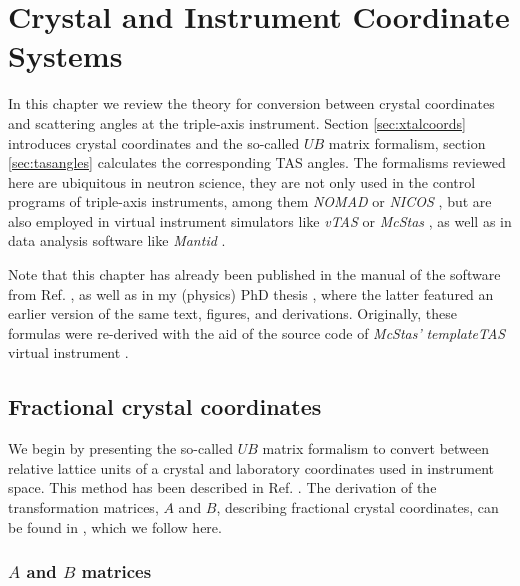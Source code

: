 %
%

\chapter{Crystal and Instrument Coordinate Systems}
\label{ch:xtal}

In this chapter we review the theory for conversion between crystal coordinates and scattering angles 
at the triple-axis instrument. Section \ref{sec:xtalcoords} introduces crystal coordinates and the so-called 
$UB$ matrix formalism, section \ref{sec:tasangles} calculates the corresponding TAS angles. 
The formalisms \cite{Lumsden2005} reviewed here are ubiquitous in neutron science, they are not only used 
in the control programs of triple-axis instruments, among them \textit{NOMAD} \cite{web_NOMAD} 
or \textit{NICOS} \cite{web_NICOS}, but are also employed in virtual instrument simulators like \textit{vTAS} \cite{vTAS2013} or 
\textit{McStas} \cite{McStas2020}, as well as in data analysis software like \textit{Mantid} \cite{Arnold2014}.

Note that this chapter has already been published in the manual of the software from Ref. \cite{Takin2021},
as well as in my (physics) PhD thesis \cite[pp. 139-143]{PhDWeber},
where the latter featured an earlier version of the same text, figures, and derivations.
Originally, these formulas were re-derived with the aid of the source
code of \textit{McStas'} \textit{templateTAS} virtual instrument \cite{web_mcstas_templateTAS, McStas2020}.


\section{Fractional crystal coordinates \label{sec:xtalcoords}}

We begin by presenting the so-called $UB$ matrix formalism to convert between relative lattice units 
of a crystal and laboratory coordinates used in instrument space. This method has been described in 
Ref. \cite{Lumsden2005}. The derivation of the transformation matrices, $A$ and $B$, describing fractional
crystal coordinates, can be found in \cite{wiki_fractional}, which we follow here.

\subsection{$A$ and $B$ matrices}
